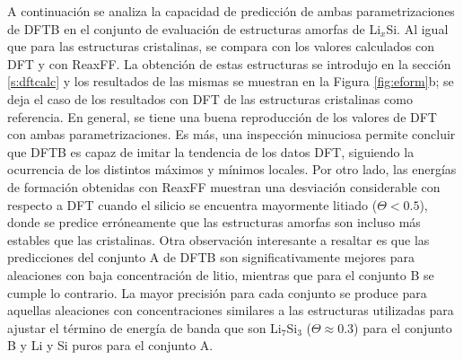 A continuación se analiza la capacidad de predicción de ambas parametrizaciones
de DFTB en el conjunto de evaluación de estructuras amorfas de Li$_x$Si. Al
igual que para las estructuras cristalinas, se compara con los valores
calculados con DFT y con ReaxFF. La obtención de estas estructuras se introdujo
en la sección \ref{s:dftcalc} y los resultados de las mismas se muestran
en la Figura \ref{fig:eform}b; se deja el caso de los resultados con DFT de
las estructuras cristalinas como referencia. En general, se tiene una buena
reproducción de los valores de DFT con ambas parametrizaciones. Es más, una
inspección minuciosa permite concluir que DFTB es capaz de imitar la tendencia
de los datos DFT, siguiendo la ocurrencia de los distintos máximos y mínimos
locales. Por otro lado, las energías de formación obtenidas con ReaxFF muestran
una desviación considerable con respecto a DFT cuando el silicio se encuentra
mayormente litiado ($\Theta < 0.5$), donde se predice erróneamente que las
estructuras amorfas son incluso más estables que las cristalinas. Otra
observación interesante a resaltar es que las predicciones del conjunto A de
DFTB son significativamente mejores para aleaciones con baja concentración de
litio, mientras que para el conjunto B se cumple lo contrario. La mayor
precisión para cada conjunto se produce para aquellas aleaciones con
concentraciones similares a las estructuras utilizadas para ajustar el término
de energía de banda que son Li$_7$Si$_3$ ($\Theta \approx 0.3$) para el conjunto
B y Li y Si puros para el conjunto A.
